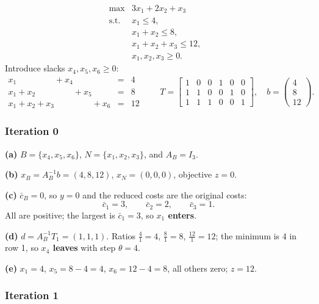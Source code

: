 \documentclass[11pt]{article}
\DeclareMathOperator*{\maximize}{max}
\theoremstyle{definition}
\theoremstyle{plain}
\begin{document}
\[
\begin{array}{llr}
  \maximize & 3x_1 + 2x_2 + x_3 & \\
  \text{s.t.}
    & x_1 \le 4, & \\
    & x_1 + x_2 \le 8, & \\
    & x_1 + x_2 + x_3 \le 12, & \\
    & x_1, x_2, x_3 \ge 0 . &
\end{array}
\]
Introduce slacks $x_4, x_5, x_6 \ge 0$:
\[
  \begin{array}{rcl}
  x_1 \phantom{{}+x_2} \phantom{{}+x_3} + x_4 \phantom{{}+x_5}
    \phantom{{}+x_6} &=& 4 \\
  x_1 + x_2 \phantom{{}+x_3} \phantom{{}+x_4} + x_5
    \phantom{{}+x_6} &=& 8 \\
  x_1 + x_2 + x_3 \phantom{{}+x_4} \phantom{{}+x_5} + x_6 &=& 12
  \end{array}
  \qquad
  T = \begin{bmatrix}
    1 & 0 & 0 & 1 & 0 & 0 \\
    1 & 1 & 0 & 0 & 1 & 0 \\
    1 & 1 & 1 & 0 & 0 & 1
  \end{bmatrix},
  \quad
  b = \begin{pmatrix} 4 \\ 8 \\ 12 \end{pmatrix}.
\]

\subsubsection*{Iteration 0}

\textbf{(a)} $B = \{x_4, x_5, x_6\}$, $N = \{x_1, x_2, x_3\}$, and
$A_B = I_3$.

\textbf{(b)} $x_B = A_B^{-1}b = (4, 8, 12)$, $x_N = (0,0,0)$, objective
$z = 0$.

\textbf{(c)} $\bar{c}_B = 0$, so $y = 0$ and the reduced costs are the
original costs:
\[
  \bar{c}_{1} = 3, \qquad \bar{c}_{2} = 2, \qquad \bar{c}_{3} = 1 .
\]
All are positive; the largest is $\bar{c}_1 = 3$, so \textbf{$x_1$
enters}.

\textbf{(d)} $d = A_B^{-1} T_1 = (1,1,1)$. Ratios
$\tfrac41 = 4$, $\tfrac81 = 8$, $\tfrac{12}{1} = 12$; the minimum is
$4$ in row 1, so \textbf{$x_4$ leaves} with step
$\theta = 4$.

\textbf{(e)} $x_1 = 4$, $x_5 = 8 - 4 = 4$, $x_6 = 12 - 4 = 8$, all
others zero; $z = 12$.

\subsubsection*{Iteration 1}
\end{document}
